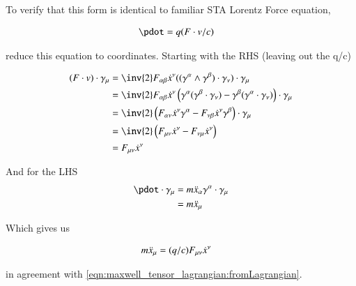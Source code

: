 To verify that this form is identical to familiar STA Lorentz Force equation,

\begin{align}
\pdot &= q (F \cdot v/c) 
\end{align}

reduce this equation to coordinates.  Starting with the RHS (leaving out the q/c)

\begin{align*}
(F \cdot v) \cdot \gamma_\mu 
&= \inv{2} F_{\alpha\beta} \xdot^\nu ((\gamma^{\alpha} \wedge \gamma^{\beta}) \cdot \gamma_\nu) \cdot \gamma_\mu \\
&= \inv{2} F_{\alpha\beta} \xdot^\nu \left( \gamma^{\alpha} (\gamma^{\beta} \cdot \gamma_\nu) -\gamma^{\beta} (\gamma^{\alpha} \cdot \gamma_\nu) \right) \cdot \gamma_\mu \\
&= \inv{2} \left( F_{\alpha\nu} \xdot^\nu \gamma^{\alpha} - F_{\nu\beta} \xdot^\nu \gamma^{\beta} \right) \cdot \gamma_\mu \\
&= \inv{2} \left( F_{\mu\nu} \xdot^\nu - F_{\nu\mu} \xdot^\nu \right) \\
&= F_{\mu\nu} \xdot^\nu \\
\end{align*}

And for the LHS
\begin{align*}
\pdot \cdot \gamma_\mu &= m \xddot_\alpha \gamma^\alpha \cdot \gamma_\mu \\
&= m \xddot_\mu 
\end{align*}

Which gives us

\begin{align}
m \ddot{x}_\mu &= (q/c) F_{\mu\nu} \dot{x}^\nu
\end{align}

in agreement with \ref{eqn:maxwell_tensor_lagrangian:fromLagrangian}.
